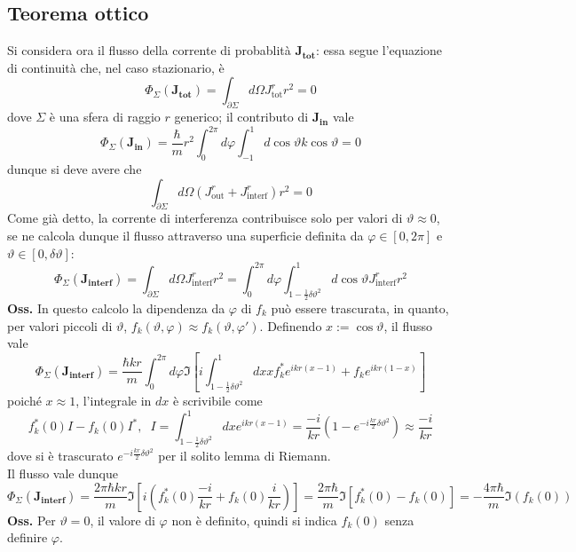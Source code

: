 \subsection{Teorema ottico}
Si considera ora il flusso della corrente di probablità $\mathbf{J_\textbf{tot}}$: essa segue
l'equazione di continuità che, nel caso stazionario, è
$$\Phi_\Sigma(\mathbf{J_\textbf{tot}}) = \int_{\partial\Sigma}^{}d\Omega J^r_\text{tot}r^2 =0$$
dove $\Sigma$ è una sfera di raggio $r$ generico; il contributo di $\mathbf{J_\textbf{in}}$ vale
$$\Phi_\Sigma(\mathbf{J_\textbf{in}}) = \frac{\hbar}{m}r^2
\int_{0}^{2\pi}d\varphi\int_{-1}^{1}d\cos\vartheta k\cos\vartheta = 0$$
dunque si deve avere che
$$\int_{\partial\Sigma}^{}d\Omega \left(J^r_\text{out}+J^r_\text{interf}\right)r^2 = 0$$
Come già detto, la corrente di interferenza contribuisce solo per valori di $\vartheta\approx0$, se
ne calcola dunque il flusso attraverso una superficie definita da $\varphi\in[0,2\pi]$ e
$\vartheta\in[0,\delta\vartheta]$:
$$\Phi_\Sigma(\mathbf{J_\textbf{interf}})=
\int_{\partial\Sigma}d\Omega J^r_\text{interf}r^2 = \int_{0}^{2\pi}d\varphi
\int_{1-\frac12\delta\vartheta^2}^{1}d\cos\vartheta J^r_\text{interf}r^2$$
\textbf{Oss.} In questo calcolo la dipendenza da $\varphi$ di $f_k$ può essere
trascurata, in quanto, per valori piccoli di $\vartheta$, $f_k(\vartheta,\varphi)\approx
f_k(\vartheta,\varphi')$. Definendo $x:=\cos\vartheta$, il flusso vale
$$\Phi_\Sigma(\mathbf{J_\textbf{interf}}) = 
\frac{\hbar kr}{m} \int_{0}^{2\pi}d\varphi\Im\left[i\int_{1-\frac12\delta\vartheta^2}^{1}dxxf_k^*
e^{ikr(x-1)}+ f_ke^{ikr(1-x)}\right]
$$
poiché $x\approx1$, l'integrale in $dx$ è scrivibile come
$$f_k^*(0)I-f_k(0)I^*,\phantom{x}
I=\int_{1-\frac12\delta\vartheta^2}^{1}dx e^{ikr(x-1)} =
\frac{-i}{kr}\left(1-e^{-i\frac{kr}{2}\delta\vartheta^2}\right)\approx\frac{-i}{kr}$$
dove si è trascurato $e^{-i\frac{kr}{2}\delta\vartheta^2}$ per il solito lemma di Riemann.\\
Il flusso vale dunque
$$\Phi_\Sigma(\mathbf{J_\textbf{interf}})=
\frac{2\pi\hbar kr}{m}\Im\left[i\left(f^*_k(0)\frac{-i}{kr}+f_k(0)\frac{i}{kr}\right)\right]
=\frac{2\pi\hbar}{m}\Im\left[f^*_k(0) -f_k(0)\right]=-\frac{4\pi\hbar}{m}\Im(f_k(0))
$$
\textbf{Oss.} Per $\vartheta=0$, il valore di $\varphi$ non è definito, quindi si indica
$f_k(0)$ senza definire $\varphi$.

